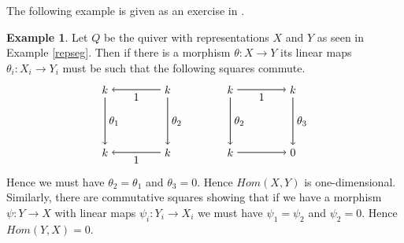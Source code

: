 \documentclass[11.5pt, twoside, a4paper, titlepage]{report}
\theoremstyle{definition}
\newtheorem{eg}[mydef]{Example}
\theoremstyle{plain}
\begin{document}
The following example is given as an exercise in \cite{CB2}.
\begin{eg}
Let $Q$ be the quiver with representations $X$ and $Y$ as seen in Example \ref{repseg}. Then if there is a morphism $\theta: X \to Y$ its linear maps $\theta_i: X_i \to Y_i$ must be such that the following squares commute.
\begin{equation*}
\begin{tikzpicture}[->,-latex, auto, every path/.style={->, semithick}, main node/.style={draw, circle}]
\node	[]		(1) at (0,0)		{$k$};
\node []		(2) at (2,0)		{$k$};
\node []		(3) at (4,0)		{$k$};
\node [] 		(4) at (6,0)		{$k$};

\node	[]		(11) at (0,-2)		{$k$};
\node []		(21) at (2,-2)		{$k$};
\node []		(31) at (4,-2)		{$k$};
\node []		(41) at (6,-2)		{$0$};

\draw (21) edge node [auto, swap] {$$} node [auto] {1} (11);
\draw (31) edge node [auto] {$$} (41);
\draw (2) edge node [auto, swap] {$$} node [auto] {1} (1);
\draw (3) edge node [auto] {$$} node [auto, swap] {1} (4);

\draw (1) edge node [auto] {$\theta_1$} (11);
\draw (2) edge node [auto] {$\theta_2$} (21);
\draw (3) edge node [auto]{$\theta_2$} (31);
\draw (4) edge node [auto] {$\theta_3$} (41);
\end{tikzpicture}
\end{equation*}
Hence we must have $\theta_2=\theta_1$ and $\theta_3=0$. Hence $Hom(X,Y)$ is one-dimensional. Similarly, there are commutative squares showing that if we have a morphism $\psi: Y \to X$ with linear maps $\psi_i: Y_i \to X_i$ we must have $\psi_1=\psi_2$ and $\psi_2=0$. Hence $Hom(Y,X)=0$.
\end{eg}
\end{document}
